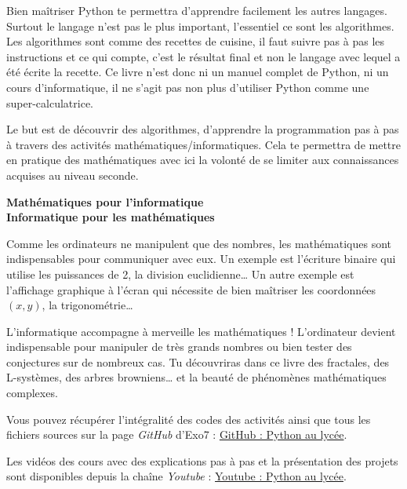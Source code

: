 Bien maîtriser Python te permettra d'apprendre facilement les autres langages. Surtout le langage n'est pas le plus important, l'essentiel ce sont les algorithmes. Les algorithmes sont comme des recettes de cuisine, il faut suivre pas à pas les instructions et ce qui compte, c'est le résultat final et non le langage avec lequel a été écrite la recette. Ce livre n'est donc ni un manuel complet de Python, ni un cours d'informatique, il ne s'agit pas non plus d'utiliser Python comme une super-calculatrice.

Le but est de découvrir des algorithmes, d'apprendre la programmation pas à pas à travers des activités mathématiques/informatiques. Cela te permettra de mettre en pratique des mathématiques avec ici la volonté de se limiter aux connaissances acquises au niveau seconde.

\bigskip

{\large\textbf{Mathématiques pour l'informatique}}\\
{\large\textbf{Informatique pour les mathématiques}}

Comme les ordinateurs ne manipulent que des nombres, les mathématiques sont indispensables pour communiquer avec eux. Un exemple est l'écriture binaire qui utilise les puissances de 2, la division euclidienne\ldots{} Un autre exemple est l'affichage graphique à l'écran qui nécessite de bien maîtriser les  coordonnées $(x,y)$, la trigonométrie\ldots

L'informatique accompagne à merveille les mathématiques ! L'ordinateur devient indispensable pour manipuler de très grands nombres ou bien tester des conjectures sur de nombreux cas. Tu découvriras dans ce livre des fractales, des L-systèmes, des arbres browniens\ldots{} et la beauté de phénomènes mathématiques complexes.

\bigskip

\begin{center}
Vous pouvez récupérer l'intégralité des codes \Python{} des activités ainsi que tous les fichiers sources sur la page \emph{GitHub} d'Exo7 :
\href{https://github.com/exo7math}{\og{}GitHub : Python au lycée\fg{}}.

\medskip

Les vidéos des cours avec des explications pas à pas et la présentation des projets sont disponibles depuis la chaîne \emph{Youtube} :
\href{https://www.youtube.com/PythonAuLycée}{\og{}Youtube : Python au lycée\fg{}}.
\end{center}


